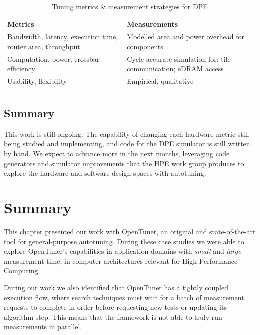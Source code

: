 \begin{table}[htpb]
\centering
\begin{tabular}{@{}p{}p{}@{}}
\toprule
\textbf{Metrics} & \textbf{Measurements} \\ \midrule
Bandwidth, latency, execution time, router area, throughput & Modelled area and power overhead for components \\
\addlinespace
Computation, power, crossbar efficiency & Cycle accurate simulation for: tile communication; eDRAM access \\
\addlinespace
Usability, flexibility & Empirical, qualitative \\ \bottomrule
\addlinespace
\end{tabular}
\caption{Tuning metrics \& measurement strategies for DPE}
\label{tab:metrics-measurements}
\end{table}


\subsection{Summary}
\label{subsec:DPEconcl}

This work is still ongoing. The capability of changing each hardware metric
still being studied and implementing, and code for the DPE simulator is still
written by hand. We expect to advance more in the next months, leveraging code
generators and simulator improvements that the HPE work group produces to
explore the hardware and software design spaces with autotuning.

\section{Summary}

This chapter presented our work with OpenTuner, an original and
state-of-the-art tool for general-purpose autotuning. During these case studies
we were able to explore OpenTuner's capabilities in application domains
with \textit{small} and \textit{large} measurement time, in computer
architectures relevant for High-Performance Computing.

During our work we also identified that OpenTuner has a tightly coupled
execution flow, where search techniques must wait for a batch of measurement
requests to complete in order before requesting new tests or updating its
algorithm step. This means that the framework is not able to truly run
measurements in parallel.

